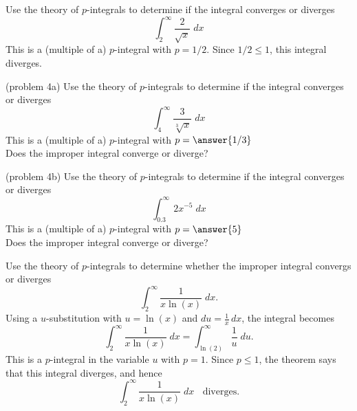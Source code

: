 \documentclass{ximera}
\begin{document}
\begin{example}[example 4]
Use the theory of $p$-integrals to determine if the integral converges or diverges
\[
\int_2^\infty \frac{2}{\sqrt x} \; dx
\]
This is a (multiple of a) $p$-integral with $p = 1/2$. Since $1/2 \leq 1$, this integral diverges.
\end{example}




\begin{problem}(problem 4a)
Use the theory of $p$-integrals to determine if the integral converges or diverges
\[
\int_4^\infty \frac{3}{\sqrt[3] x} \; dx
\]
This is a (multiple of a) $p$-integral with $p = \answer{1/3}$\\
Does the improper integral converge or diverge?
\begin{multipleChoice}
\end{multipleChoice}
\end{problem}





\begin{problem}(problem 4b)
Use the theory of $p$-integrals to determine if the integral converges or diverges
\[
\int_{0.3}^\infty 2x^{-5} \; dx
\]
This is a (multiple of a) $p$-integral with $p = \answer{5}$\\
Does the improper integral converge or diverge?
\begin{multipleChoice}
\end{multipleChoice}
\end{problem}



\begin{example}[example 5]
Use the theory of $p$-integrals to determine whether the improper integral convergs or diverges
\[
\int_2^\infty \frac{1}{x\ln(x)} \; dx.
\]
Using a $u$-substitution with $u = \ln(x)$ and $du = \frac{1}{x} \, dx$, the integral becomes
\[
\int_2^\infty \frac{1}{x\ln(x)} \; dx = \int_{\ln(2)}^\infty \frac{1}{u} \; du.
\]
This is a $p$-integral in the variable $u$ with $p=1$. Since $p \leq 1$, the theorem says that this integral diverges, and hence
\[
\int_2^\infty \frac{1}{x\ln(x)} \; dx \;\; \text{ diverges}.
\]
\end{example}
\end{document}
